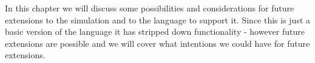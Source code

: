 In this chapter we will discuss some possibilities and considerations for future extensions to the simulation and to the language to support it.
Since this is just a basic version of the language it has stripped down functionality - however future extensions are possible and we will cover what intentions we could have for future extensions.